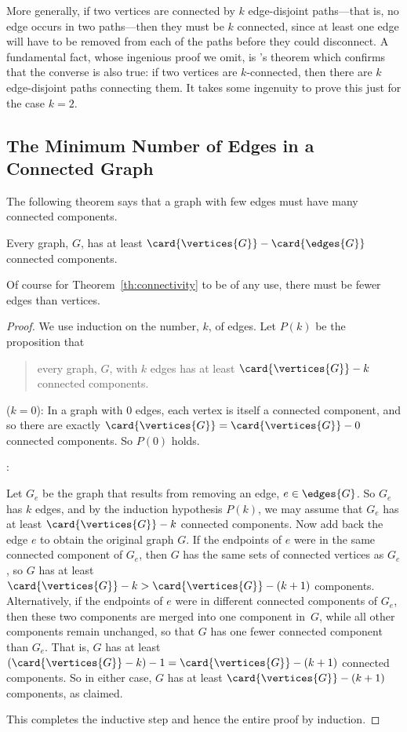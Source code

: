 More generally, if two vertices are connected by $k$ edge-disjoint
paths---that is, no edge occurs in two paths---then they must
be $k$ connected, since at least one edge will have to be removed from
each of the paths before they could disconnect.  A fundamental fact,
whose ingenious proof we omit, is 's theorem which
confirms that the converse is also true: if two vertices are
$k$-connected, then there are $k$ edge-disjoint paths connecting them.
It takes some ingenuity to prove this just for the case $k=2$.

\subsection{The Minimum Number of Edges in a Connected Graph}

The following theorem says that a graph with few edges must have many
connected components.
\begin{theorem}\label{th:connectivity}
Every graph, $G$, has at least $\card{\vertices{G}} - \card{\edges{G}}$
connected components.
\end{theorem}
Of course for Theorem~\ref{th:connectivity} to be of any use, there must
be fewer edges than vertices.

\begin{proof}
We use induction on the number, $k$, of edges.  Let $P(k)$ be the
proposition that
\begin{quote}
every graph, $G$, with $k$ edges has at least $\card{\vertices{G}}-k$
connected components.
\end{quote}

 ($k=0$): In a graph with 0 edges, each
vertex is itself a connected component, and so there are exactly
$\card{\vertices{G}} = \card{\vertices{G}} - 0$ connected components.
So $P(0)$ holds.

:

\iffalse
Now we assume that the induction hypothesis holds for every $k$-edge
graph in order to prove that it holds for every $(k+1)$-edge graph,
where $k \geq 0$.
\fi

Let $G_e$ be the graph that results from removing an edge, $e \in
\edges{G}$.  So $G_e$ has $k$ edges, and by the induction hypothesis
$P(k)$, we may assume that $G_e$ has at least $\card{\vertices{G}} -
k$ connected components.  Now add back the edge $e$ to obtain the
original graph $G$.  If the endpoints of $e$ were in the same
connected component of $G_e$, then $G$ has the same sets of connected
vertices as $G_e$, so $G$ has at least $\card{\vertices{G}} - k >
\card{\vertices{G}} - (k+1)$ components.  Alternatively, if the
endpoints of $e$ were in different connected components of $G_e$, then
these two components are merged into one component in~$G$, while all
other components remain unchanged, so that $G$ has one fewer connected
component than $G_e$.  That is, $G$ has at least $(\card{\vertices{G}}
- k) - 1 = \card{\vertices{G}} - (k+1)$ connected components.  So in
either case, $G$ has at least $\card{\vertices{G}} - (k+1)$
components, as claimed.

This completes the inductive step and hence the entire proof by
induction.
\end{proof}

